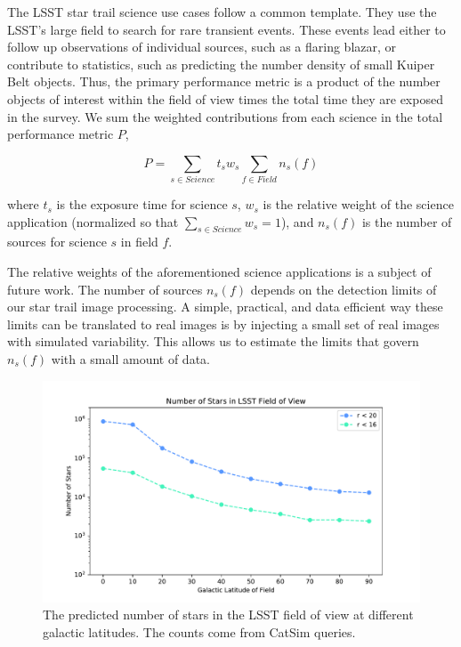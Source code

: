 \documentclass[12pt, letterpaper]{article}
\begin{document}
The LSST star trail science use cases follow a common template. They use the LSST's large field to search for rare transient events. These events lead either to follow up observations of individual sources, such as a flaring blazar, or contribute to statistics, such as predicting the number density of small Kuiper Belt objects. Thus, the primary performance metric is a product of the number objects of interest within the field of view times the total time they are exposed in the survey. We sum the weighted contributions from each science in the total performance metric $P$,

$$P = \sum_{s \in Science} t_s w_s \sum_{f \in Field} n_s(f)$$

\noindent where $t_{s}$ is the exposure time for science $s$, $w_s$ is the relative weight of the science application (normalized so that $\sum_{s \in Science} w_s = 1$), and $n_s(f)$ is the number of sources for science $s$ in field $f$.

The relative weights of the aforementioned science applications is a subject of future work. The number of sources $n_s(f)$ depends on the detection limits of our star trail image processing. A simple, practical, and data efficient way these limits can be translated to real images is by injecting a small set of real images with simulated variability. This allows us to estimate the limits that govern $n_s(f)$ with a small amount of data.

\begin{figure}
\center
\includegraphics[width=0.95\columnwidth]{starcount.pdf}
\caption{The predicted number of stars in the LSST field of view at different galactic latitudes. The counts come from CatSim queries.}
\label{fig:count}
\end{figure}
\end{document}
